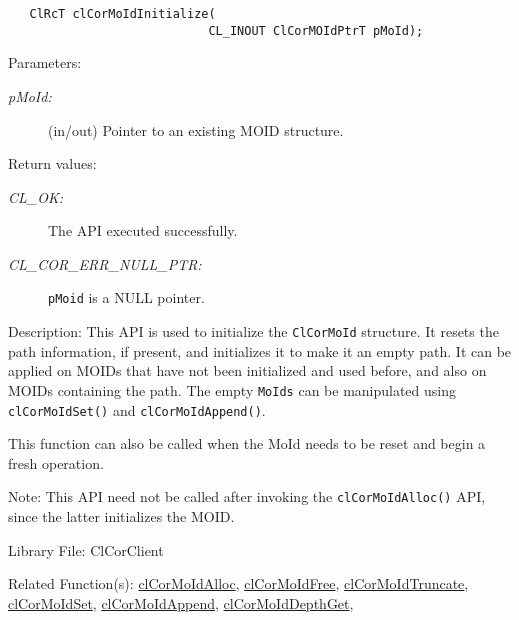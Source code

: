 \begin{flushleft}
\begin{Desc}
\footnotesize\begin{verbatim}   ClRcT clCorMoIdInitialize(
             				CL_INOUT ClCorMOIdPtrT pMoId);
\end{verbatim}
\normalsize
\end{Desc}
\begin{Desc}
\item[Parameters:]
\begin{description}
\item[{\em p\-MoId:}](in/out) Pointer to an existing MOID structure.\end{description}
\end{Desc}
\begin{Desc}
\item[Return values:]
\begin{description}
\item[{\em CL\_\-OK:}]The API executed successfully. 
\item[{\em CL\_\-COR\_\-ERR\_\-NULL\_\-PTR:}]{\tt{pMoid}} is a NULL pointer.\end{description}
\end{Desc}
\begin{Desc}
\item[Description:]This API is used to initialize the {\tt{ClCorMoId}} structure. It resets the path information, if present, and 
initializes it to make it an empty path. It can be applied on MOIDs that have not been initialized and used before, and also on 
MOIDs containing the path. The empty {\tt{MoIds}} can be manipulated using {\tt{clCorMoIdSet()}} and {\tt{clCorMoIdAppend()}}.
\par
This function can also be called when the MoId needs to be reset and begin a fresh operation.\end{Desc}
\begin{Desc}
\item[Note:]This API need not be called after invoking the {\tt{clCorMoIdAlloc()}} API, since the latter initializes the MOID.
\end{Desc}
\begin{Desc}
\item[Library File:]Cl\-Cor\-Client\end{Desc}
\begin{Desc}
\item[Related Function(s):]\hyperlink{pagecor113}{cl\-Cor\-MoId\-Alloc}, \hyperlink{pagecor114}{cl\-Cor\-MoId\-Free},
\hyperlink{pagecor115}{cl\-Cor\-MoId\-Truncate}, \hyperlink{pagecor116}{cl\-Cor\-MoId\-Set}, 
\hyperlink{pagecor117}{cl\-Cor\-MoId\-Append}, \hyperlink{pagecor118}{cl\-Cor\-MoId\-Depth\-Get}, 

\end{Desc}
\end{flushleft}
